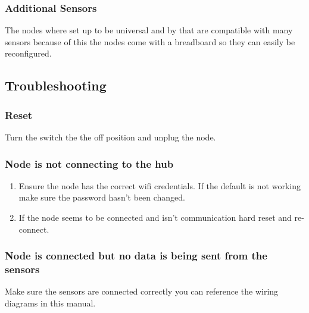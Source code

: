     \subsubsection{Additional Sensors}
      The nodes where set up to be universal and by that are compatible with
      many sensors because of this the nodes come with a breadboard so they can
      easily be reconfigured.\\
\newpage
  \subsection{Troubleshooting}
  \subsubsection{Reset}
  Turn the switch the the off position and unplug the node.
  \subsubsection{Node is not connecting to the hub}
  \begin{enumerate}
    \item Ensure the node has the correct wifi credentials. If the default is not
    working make sure the password hasn't been changed.
    \item If the node seems to be connected and isn't communication hard reset and re-connect.
  \end{enumerate}
  \subsubsection{Node is connected but no data is being sent from the sensors}
  Make sure the sensors are connected correctly you can reference the wiring diagrams
  in this manual.